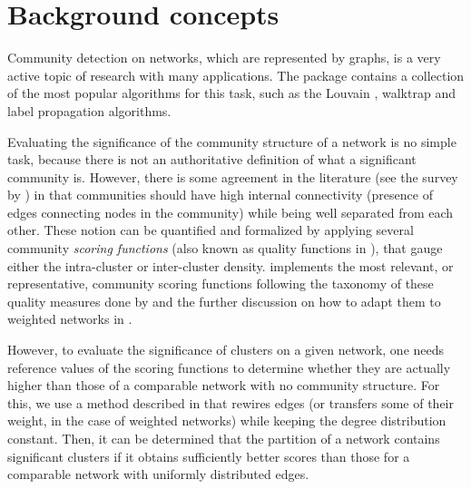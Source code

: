 \section{Background concepts}

Community detection on networks, which are represented by graphs, is a very active topic of research with many applications. The  \citep{igraph} package contains a collection of the most popular algorithms for this task, such as the Louvain \citep{fastunfolding}, walktrap \citep{walktrap} and label propagation \cite{label_propagation} algorithms.


Evaluating the significance of the community structure of a network is no simple task, because there is not an authoritative definition of what a significant community is. However, there is some agreement in the literature (see the survey by \cite{Fortunato2010}) in that communities should have high internal connectivity (presence of edges connecting nodes in the community) while being well separated from each other. These notion can be quantified and formalized by applying several community {\em scoring functions} (also known as quality functions  in \citep{Fortunato2010}), that gauge either the intra-cluster or inter-cluster density.  implements the most relevant, or representative, community scoring functions following the 
taxonomy of these quality measures done by \cite{groundtruth} and the further discussion on how to adapt them to weighted networks in \citep{arratia2021clustering}.

However, to evaluate the significance of clusters on a given network, one needs reference values of the scoring functions to determine whether they are actually higher than those of a comparable network with no community structure. For this, we use a method described in \citep{arratia2021clustering} that rewires edges (or transfers some of their weight, in the case of weighted networks) while keeping the degree distribution constant. Then, it can be determined that the partition of a network contains significant clusters if it obtains sufficiently
better scores than those for a comparable network with uniformly distributed edges. 


